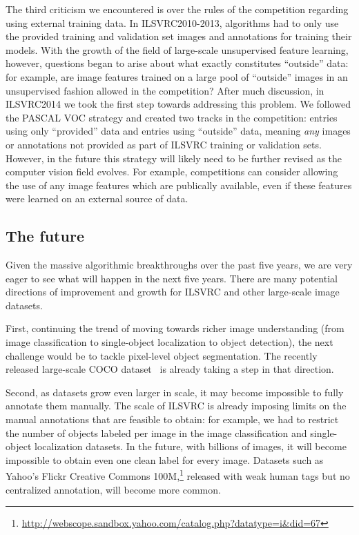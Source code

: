  The third criticism we encountered is over the rules of the competition regarding using external training data. In ILSVRC2010-2013, algorithms had to only use the provided training and validation set images and annotations for training their models. With the growth of the field of large-scale unsupervised feature learning, however, questions began to arise about what exactly constitutes ``outside'' data: for example, are  image features trained on a large pool of ``outside'' images in an unsupervised fashion allowed in the competition? After much discussion, in ILSVRC2014 we took the first step towards addressing this problem. We followed the PASCAL VOC strategy and created two tracks in the competition: entries using only ``provided'' data and entries using ``outside'' data, meaning \emph{any} images or annotations not provided as part of ILSVRC training or validation sets. However, in the future this strategy will likely need to be further revised as the computer vision field evolves. For example, competitions can consider allowing the use of any image features which are publically available, even if these features were learned on an external source of data.


 

\subsection{The future}

Given the massive algorithmic breakthroughs over the past five years, we are very eager to see what will happen in the next five years. There are many potential directions of improvement and growth for ILSVRC and other large-scale image datasets.

First, continuing the trend of moving towards richer image understanding (from image classification to single-object localization to object detection), the next challenge would be to tackle pixel-level object segmentation. The recently released large-scale COCO dataset~\citep{COCO} is already taking a step in that direction. 

Second, as datasets grow  even larger in scale, it may become impossible to fully annotate them manually. The 
scale of ILSVRC is already imposing limits on the manual annotations that are feasible to obtain: for example, we had to restrict the number of objects labeled per image in the image classification and single-object localization datasets. In the future, with billions of images, it will become impossible to obtain even one clean label for every image.  Datasets such as Yahoo's Flickr Creative Commons 100M,\footnote{\url{http://webscope.sandbox.yahoo.com/catalog.php?datatype=i&did=67}} released with weak human tags but no centralized annotation, will become more common.

